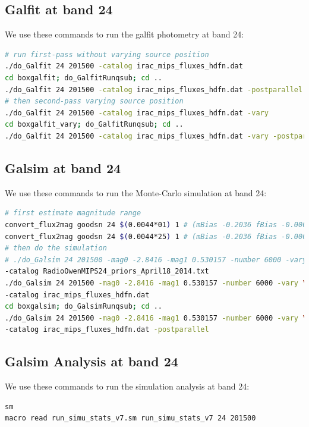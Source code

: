 \documentclass[11pt,a4paper]{article}
\begin{document}
\subsection{Galfit at band 24}

We use these commands to run the galfit photometry at band 24:

\begin{lstlisting}[language=bash]
# run first-pass without varying source position
./do_Galfit 24 201500 -catalog irac_mips_fluxes_hdfn.dat
cd boxgalfit; do_GalfitRunqsub; cd ..
./do_Galfit 24 201500 -catalog irac_mips_fluxes_hdfn.dat -postparallel
# then second-pass varying source position
./do_Galfit 24 201500 -catalog irac_mips_fluxes_hdfn.dat -vary
cd boxgalfit_vary; do_GalfitRunqsub; cd ..
./do_Galfit 24 201500 -catalog irac_mips_fluxes_hdfn.dat -vary -postparallel
\end{lstlisting}

\subsection{Galsim at band 24}

We use these commands to run the Monte-Carlo simulation at band 24:

\begin{lstlisting}[language=bash]
# first estimate magnitude range
convert_flux2mag goodsn 24 $(0.0044*01) 1 # (mBias -0.2036 fBias -0.000553)
convert_flux2mag goodsn 24 $(0.0044*25) 1 # (mBias -0.2036 fBias -0.000553)
# then do the simulation
# ./do_Galsim 24 201500 -mag0 -2.8416 -mag1 0.530157 -number 6000 -vary \
-catalog RadioOwenMIPS24_priors_April18_2014.txt
./do_Galsim 24 201500 -mag0 -2.8416 -mag1 0.530157 -number 6000 -vary \
-catalog irac_mips_fluxes_hdfn.dat
cd boxgalsim; do_GalsimRunqsub; cd ..
./do_Galsim 24 201500 -mag0 -2.8416 -mag1 0.530157 -number 6000 -vary \
-catalog irac_mips_fluxes_hdfn.dat -postparallel
\end{lstlisting}

\subsection{Galsim Analysis at band 24}

We use these commands to run the simulation analysis at band 24:

\begin{lstlisting}[language=bash]
sm
macro read run_simu_stats_v7.sm run_simu_stats_v7 24 201500
\end{lstlisting}
\end{document}
